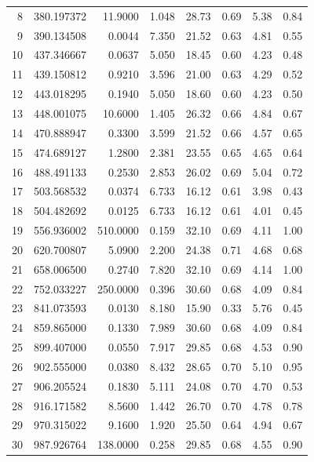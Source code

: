 \begin{longtable}{rrrrrrrr}
8    &   380.197372&   11.9000&  1.048&   28.73&   0.69&  5.38&  0.84\\
9    &   390.134508&    0.0044&  7.350&   21.52&   0.63&  4.81&  0.55\\
10    &   437.346667&    0.0637&  5.050&   18.45&   0.60&  4.23&  0.48\\
11    &   439.150812&    0.9210&  3.596&   21.00&   0.63&  4.29&  0.52\\
12    &   443.018295&    0.1940&  5.050&   18.60&   0.60&  4.23&  0.50\\
13    &   448.001075&   10.6000&  1.405&   26.32&   0.66&  4.84&  0.67\\
14    &   470.888947&    0.3300&  3.599&   21.52&   0.66&  4.57&  0.65\\
15    &   474.689127&    1.2800&  2.381&   23.55&   0.65&  4.65&  0.64\\
16    &   488.491133&    0.2530&  2.853&   26.02&   0.69&  5.04&  0.72\\
17    &   503.568532&    0.0374&  6.733&   16.12&   0.61&  3.98&  0.43\\
18    &   504.482692&    0.0125&  6.733&   16.12&   0.61&  4.01&  0.45\\
19    &   556.936002&  510.0000&  0.159&   32.10&   0.69&  4.11&  1.00\\
20    &   620.700807&    5.0900&  2.200&   24.38&   0.71&  4.68&  0.68\\
21    &   658.006500&    0.2740&  7.820&   32.10&   0.69&  4.14&  1.00\\
22    &   752.033227&  250.0000&  0.396&   30.60&   0.68&  4.09&  0.84\\
23    &   841.073593&    0.0130&  8.180&   15.90&   0.33&  5.76&  0.45\\
24    &   859.865000&    0.1330&  7.989&   30.60&   0.68&  4.09&  0.84\\
25    &   899.407000&    0.0550&  7.917&   29.85&   0.68&  4.53&  0.90\\
26    &   902.555000&    0.0380&  8.432&   28.65&   0.70&  5.10&  0.95\\
27    &   906.205524&    0.1830&  5.111&   24.08&   0.70&  4.70&  0.53\\
28    &   916.171582&    8.5600&  1.442&   26.70&   0.70&  4.78&  0.78\\
29    &   970.315022&    9.1600&  1.920&   25.50&   0.64&  4.94&  0.67\\
30    &   987.926764&  138.0000&  0.258&   29.85&   0.68&  4.55&  0.90\\
\hline
\end{longtable}


